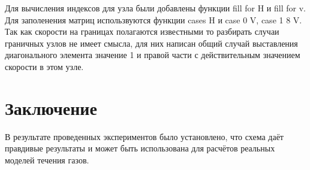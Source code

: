 \documentclass[a4paper, 25pt]{article}
\begin{document}
Для вычисления индексов для узла были добавлены функции fill for H и fill for v.
Для заполенения матриц использвуются функции cases H и case 0 V, case 1 8 V. Так как скорости на границах полагаются известными то разбирать случаи граничных узлов не имеет смысла, для них написан общий случай выставления диагонального элемента значение 1 и правой части с действительным значением скорости в этом узле.

\section{Заключение}
В результате проведенных экспериментов было установлено, что схема даёт правдивые результаты и может быть использована для расчётов реальных моделей течения газов. 
\end{document}
